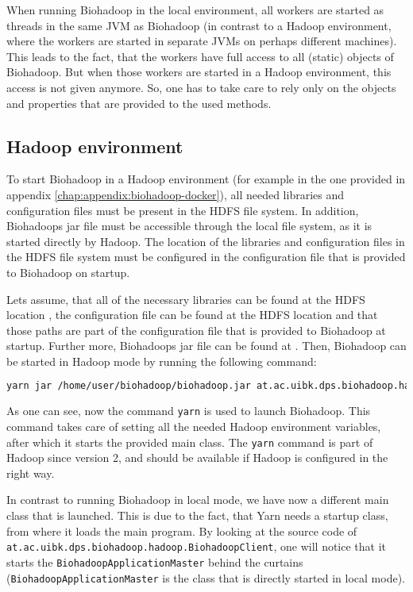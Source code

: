   When running Biohadoop in the local environment, all workers are started as threads in the same JVM as Biohadoop (in contrast to a Hadoop environment, where the workers are started in separate JVMs on perhaps different machines). This leads to the fact, that the workers have full access to all (static) objects of Biohadoop. But when those workers are started in a Hadoop environment, this access is not given anymore. So, one has to take care to rely only on the objects and properties that are provided to the used methods.

  \subsection{Hadoop environment}
  \label{chap:usage:hadoop}
  To start Biohadoop in a Hadoop environment (for example in the one provided in appendix \ref{chap:appendix:biohadoop-docker}), all needed libraries and configuration files must be present in the HDFS file system. In addition, Biohadoops jar file must be accessible through the local file system, as it is started directly by Hadoop. The location of the libraries and configuration files in the HDFS file system must be configured in the configuration file that is provided to Biohadoop on startup.
  
  Lets assume, that all of the necessary libraries can be found at the HDFS location , the configuration file can be found at the HDFS location  and that those paths are part of the configuration file that is provided to Biohadoop at startup. Further more, Biohadoops jar file can be found at . Then, Biohadoop can be started in Hadoop mode by running the following command:
  
  \begin{lstlisting}[language=bash]
yarn jar /home/user/biohadoop/biohadoop.jar at.ac.uibk.dps.biohadoop.hadoop.BiohadoopClient /biohadoop/configs/simple-config-json
  \end{lstlisting}

  As one can see, now the command \texttt{yarn} is used to launch Biohadoop. This command takes care of setting all the needed Hadoop environment variables, after which it starts the provided main class. The \texttt{yarn} command is part of Hadoop since version 2, and should be available if Hadoop is configured in the right way.
  
  In contrast to running Biohadoop in local mode, we have now a different main class that is launched. This is due to the fact, that Yarn needs a startup class, from where it loads the main program. By looking at the source code of \texttt{at.ac.uibk.dps.biohadoop.hadoop.BiohadoopClient}, one will notice that it starts the \texttt{BiohadoopApplicationMaster} behind the curtains (\texttt{BiohadoopApplicationMaster} is the class that is directly started in local mode).
  
